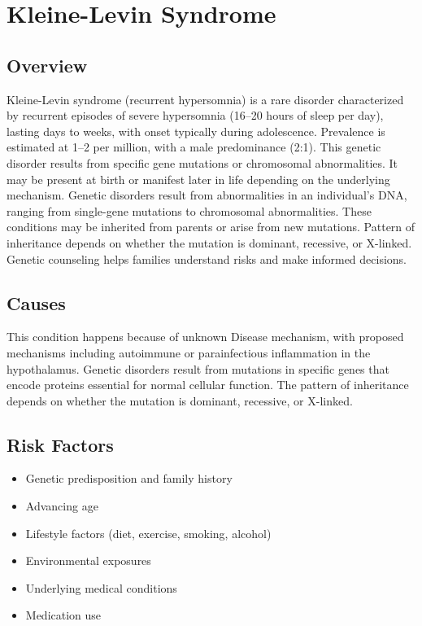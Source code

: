 \chapter{Kleine-Levin Syndrome}
\label{sec:Kleine-Levin Syndrome}

\section{Overview}
Kleine-Levin syndrome (recurrent hypersomnia) is a rare disorder characterized by recurrent episodes of severe hypersomnia (16--20 hours of sleep per day), lasting days to weeks, with onset typically during adolescence. Prevalence is estimated at 1--2 per million, with a male predominance (2:1). This genetic disorder results from specific gene mutations or chromosomal abnormalities. It may be present at birth or manifest later in life depending on the underlying mechanism. Genetic disorders result from abnormalities in an individual's DNA, ranging from single-gene mutations to chromosomal abnormalities. These conditions may be inherited from parents or arise from new mutations. Pattern of inheritance depends on whether the mutation is dominant, recessive, or X-linked. Genetic counseling helps families understand risks and make informed decisions.
\section{Causes}
This condition happens because of unknown Disease mechanism, with proposed mechanisms including autoimmune or parainfectious inflammation in the hypothalamus. Genetic disorders result from mutations in specific genes that encode proteins essential for normal cellular function. The pattern of inheritance depends on whether the mutation is dominant, recessive, or X-linked.   
\section{Risk Factors}

\begin{itemize}[noitemsep]
  \item Genetic predisposition and family history
  \item Advancing age
  \item Lifestyle factors (diet, exercise, smoking, alcohol)
  \item Environmental exposures
  \item Underlying medical conditions
  \item Medication use
\end{itemize}
